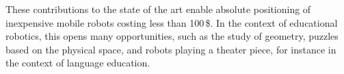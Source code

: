 \documentclass[letterpaper, 10pt, conference]{ieeeconf}
\begin{document}
These contributions to the state of the art enable absolute positioning of inexpensive mobile robots costing less than 100\,\$.
In the context of educational robotics, this opens many opportunities, such as the study of geometry, puzzles based on the physical space, and robots playing a theater piece, for instance in the context of language education.



\end{document}

